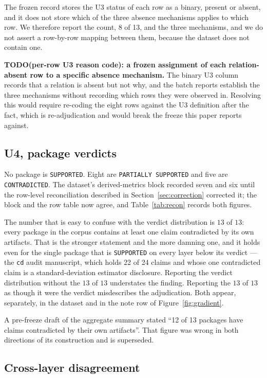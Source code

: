 \documentclass[sigconf,review]{acmart}
\newcommand{\pkg}[1]{\texttt{#1}}
\begin{document}
The frozen record stores the U3 status of each row as a binary, present or
absent, and it does not store which of the three absence mechanisms applies to
which row. We therefore report the count, 8 of 13, and the three mechanisms,
and we do not assert a row-by-row mapping between them, because the dataset
does not contain one.

\textbf{TODO(per-row U3 reason code): a frozen assignment of each
relation-absent row to a specific absence mechanism.} The binary U3 column
records that a relation is absent but not why, and the batch reports
establish the three mechanisms without recording which rows they were observed
in. Resolving this would require re-coding the eight rows against the U3
definition after the fact, which is re-adjudication and would break the freeze
this paper reports against.

\subsection{U4, package verdicts}
\label{sec:res-verdicts}

No package is \texttt{SUPPORTED}. Eight are \texttt{PARTIALLY SUPPORTED} and
five are \texttt{CONTRADICTED}. The dataset's derived-metrics block recorded
seven and six until the row-level reconciliation described in
Section~\ref{sec:correction} corrected it; the block and the row table now
agree, and Table~\ref{tab:recon} records both figures.

The number that is easy to confuse with the verdict distribution is
$13$ of $13$: every package in the corpus contains at least one claim
contradicted by its own artifacts. That is the stronger statement and the more
damning one, and it holds even for the single package that is
\texttt{SUPPORTED} on every layer below its verdict --- the \pkg{cd} audit
manuscript, which holds 22 of 24 claims and whose one contradicted claim is a
standard-deviation estimator disclosure. Reporting the verdict distribution
without the $13$ of $13$ understates the finding. Reporting the $13$ of $13$
as though it were the verdict misdescribes the adjudication. Both appear,
separately, in the dataset and in the note row of Figure~\ref{fig:gradient}.

A pre-freeze draft of the aggregate summary stated ``12 of 13 packages have
claims contradicted by their own artifacts''. That figure was wrong in both
directions of its construction and is superseded.

\subsection{Cross-layer disagreement}
\label{sec:res-disagree}
\end{document}
